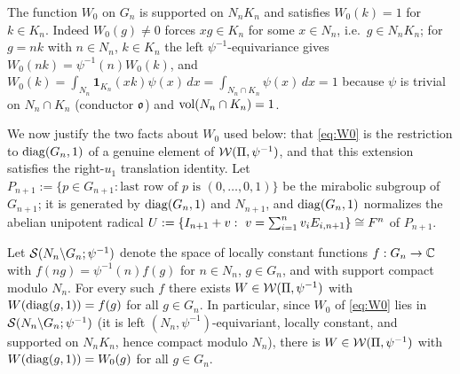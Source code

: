 The function $W_0$ on $G_n$ is supported on $N_nK_n$ and satisfies $W_0(k)=1$ for
$k\in K_n$. Indeed $W_0(g)\neq0$ forces $xg\in K_n$ for some $x\in N_n$, i.e.\
$g\in N_nK_n$; for $g=nk$ with $n\in N_n$, $k\in K_n$ the left $\psi^{-1}$-equivariance
gives $W_0(nk)=\psi^{-1}(n)W_0(k)$, and $W_0(k)=\int_{N_n}\mathbf 1_{K_n}(xk)\psi(x)\,dx
=\int_{N_n\cap K_n}\psi(x)\,dx=1$ because $\psi$ is trivial on $N_n\cap K_n$ (conductor
$\mathfrak{o}$) and $\operatorname{vol}(N_n\cap K_n)=1$.

\medskip
We now justify the two facts about $W_0$ used below: that \eqref{eq:W0} is the
restriction to $\operatorname{diag}(G_n,1)$ of a genuine element of $\mathcal{W}(\Pi,\psi^{-1})$, and that
this extension satisfies the right-$u_1$ translation identity. Let
$P_{n+1}:=\{p\in G_{n+1}:\text{last row of }p\text{ is }(0,\dots,0,1)\}$ be the
mirabolic subgroup of $G_{n+1}$; it is generated by $\operatorname{diag}(G_n,1)$ and $N_{n+1}$, and
$\operatorname{diag}(G_n,1)$ normalizes the abelian unipotent radical
$U:=\{I_{n+1}+v:\ v=\sum_{i=1}^{n}v_iE_{i,n+1}\}\cong\qtwoF^n$ of $P_{n+1}$.

\begin{qtwolemma}\label{lem:extend}
Let $\mathcal{S}(N_n\backslash G_n;\psi^{-1})$ denote the space of locally constant functions
$f:G_n\to\mathbb{C}$ with $f(ng)=\psi^{-1}(n)f(g)$ for $n\in N_n$, $g\in G_n$, and with support
compact modulo $N_n$. For every such $f$ there exists $W\in\mathcal{W}(\Pi,\psi^{-1})$ with
$W(\operatorname{diag}(g,1))=f(g)$ for all $g\in G_n$. In particular, since $W_0$ of \eqref{eq:W0}
lies in $\mathcal{S}(N_n\backslash G_n;\psi^{-1})$ \textup{(}it is left $(N_n,\psi^{-1})$-equivariant,
locally constant, and supported on $N_nK_n$, hence compact modulo $N_n$\textup{)}, there is
$W\in\mathcal{W}(\Pi,\psi^{-1})$ with $W(\operatorname{diag}(g,1))=W_0(g)$ for all $g\in G_n$.
\end{qtwolemma}

